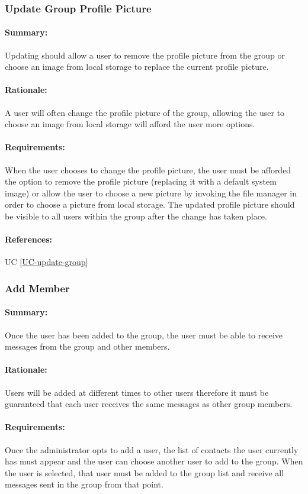 \documentclass[11pt]{article}
\begin{document}
\subsubsection{Update Group Profile Picture} \label{FR-update-group-picture}
\paragraph{Summary:}
Updating should allow a user to remove the profile picture from the group or choose an image from local storage to replace the current profile picture.
\paragraph{Rationale:}
A user will often change the profile picture of the group, allowing the user to choose an image from local storage will afford the user more options.
\paragraph{Requirements:}
When the user chooses to change the profile picture, the user must be afforded the option to remove the profile picture (replacing it with a default system image) or allow the user to choose a new picture by invoking the file manager in order to choose a picture from local storage. The updated profile picture should be visible to all users within the group after the change has taken place.
\paragraph{References:} UC \ref{UC-update-group}

\subsubsection{Add Member} \label{FR-add-member}
\paragraph{Summary:}
Once the user has been added to the group, the user must be able to receive messages from the group and other members.
\paragraph{Rationale:}
Users will be added at different times to other users therefore it must be guaranteed that each user receives the same messages as other group members.
\paragraph{Requirements:}
Once the administrator opts to add a user, the list of contacts the user currently has must appear and the user can choose another user to add to the group. When the user is selected, that user must be added to the group list and receive all messages sent in the group from that point.
\end{document}
